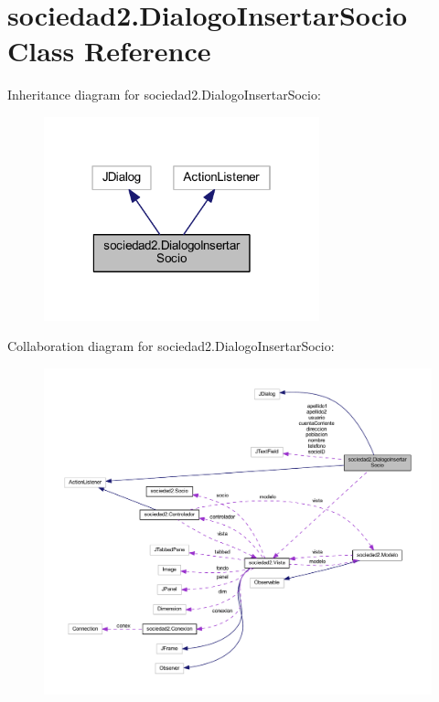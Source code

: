 \hypertarget{classsociedad2_1_1_dialogo_insertar_socio}{}\section{sociedad2.\+Dialogo\+Insertar\+Socio Class Reference}
\label{classsociedad2_1_1_dialogo_insertar_socio}


Inheritance diagram for sociedad2.\+Dialogo\+Insertar\+Socio\+:\nopagebreak
\begin{figure}[H]
\begin{center}
\leavevmode
\includegraphics[width=226pt]{classsociedad2_1_1_dialogo_insertar_socio__inherit__graph}
\end{center}
\end{figure}


Collaboration diagram for sociedad2.\+Dialogo\+Insertar\+Socio\+:
\nopagebreak
\begin{figure}[H]
\begin{center}
\leavevmode
\includegraphics[width=350pt]{classsociedad2_1_1_dialogo_insertar_socio__coll__graph}
\end{center}
\end{figure}

